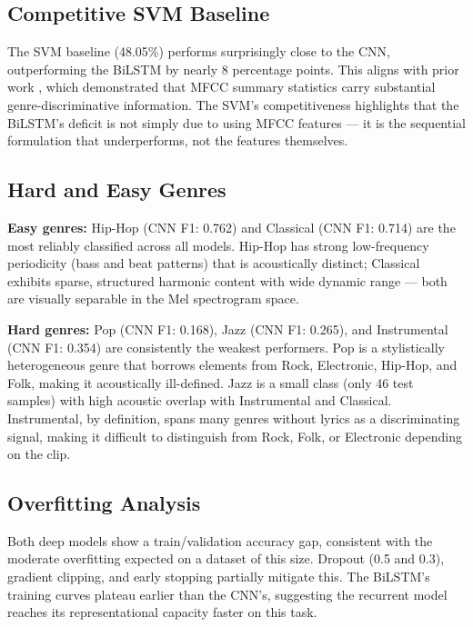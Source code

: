 \documentclass[12pt, a4paper]{article}
\begin{document}
\subsection{Competitive SVM Baseline}

The SVM baseline (48.05\%) performs surprisingly close to the CNN, outperforming the
BiLSTM by nearly 8 percentage points. This aligns with prior work \citep{tzanetakis2002musical},
which demonstrated that MFCC summary statistics carry substantial genre-discriminative
information. The SVM's competitiveness highlights that the BiLSTM's deficit is not
simply due to using MFCC features --- it is the sequential formulation that underperforms,
not the features themselves.

\subsection{Hard and Easy Genres}

\textbf{Easy genres:} Hip-Hop (CNN F1: 0.762) and Classical (CNN F1: 0.714) are the
most reliably classified across all models. Hip-Hop has strong low-frequency
periodicity (bass and beat patterns) that is acoustically distinct; Classical exhibits
sparse, structured harmonic content with wide dynamic range --- both are visually
separable in the Mel spectrogram space.

\textbf{Hard genres:} Pop (CNN F1: 0.168), Jazz (CNN F1: 0.265), and Instrumental
(CNN F1: 0.354) are consistently the weakest performers. Pop is a stylistically
heterogeneous genre that borrows elements from Rock, Electronic, Hip-Hop, and Folk,
making it acoustically ill-defined. Jazz is a small class (only 46 test samples) with
high acoustic overlap with Instrumental and Classical. Instrumental, by definition,
spans many genres without lyrics as a discriminating signal, making it difficult to
distinguish from Rock, Folk, or Electronic depending on the clip.

\subsection{Overfitting Analysis}

Both deep models show a train/validation accuracy gap, consistent with the
moderate overfitting expected on a dataset of this size. Dropout (0.5 and 0.3),
gradient clipping, and early stopping partially mitigate this. The BiLSTM's
training curves plateau earlier than the CNN's, suggesting the recurrent model
reaches its representational capacity faster on this task.
\end{document}
